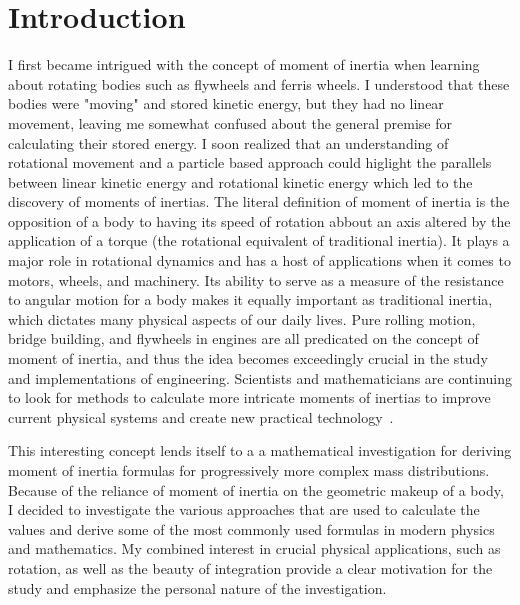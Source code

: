 \section{Introduction}
\label{sec:introduction}
I first became intrigued with the concept of moment of inertia when learning about rotating bodies such as flywheels and ferris wheels. I understood that these bodies were "moving" and stored kinetic energy, but they had no linear movement, leaving me somewhat confused about the general premise for calculating their stored energy. I soon realized that an understanding of rotational movement and a particle based approach could higlight the parallels between linear kinetic energy and rotational kinetic energy which led to the discovery of moments of inertias. The literal definition of moment of inertia is the opposition of a body to having its speed of rotation abbout an axis altered by the application of a torque (the rotational equivalent of traditional inertia). It plays a major role in rotational dynamics and has a host of applications when it comes to motors, wheels, and machinery. Its ability to serve as a measure of the resistance to angular motion for a body makes it equally important as traditional inertia, which dictates many physical aspects of our daily lives. Pure rolling motion, bridge building, and flywheels in engines are all predicated on the concept of moment of inertia, and thus the idea becomes exceedingly crucial in the study and implementations of engineering. Scientists and mathematicians are continuing to look for methods to calculate more intricate moments of inertias to improve current physical systems and create new practical technology~\parencite{Young_Freedman_Young_2020}.


This interesting concept lends itself to a a mathematical investigation for deriving moment of inertia formulas for progressively more complex mass distributions. Because of the reliance of moment of inertia on the geometric makeup of a body, I decided to investigate the various approaches that are used to calculate the values and derive some of the most commonly used formulas in modern physics and mathematics. My combined interest in crucial physical applications, such as rotation, as well as the beauty of integration provide a clear motivation for the study and emphasize the personal nature of the investigation.